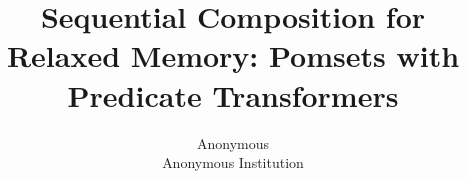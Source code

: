 \documentclass[conference,compsoc]{IEEEtran}
\author{Anonymous\\Anonymous Institution}
\title{Sequential Composition for Relaxed Memory: Pomsets with Predicate Transformers}
\theoremstyle{plain}
\theoremstyle{definition}
\theoremstyle{remark}
\begin{document}
 
\pagestyle{plain}
\maketitle
\begin{abstract}\end{abstract}








%



%
\end{document}
